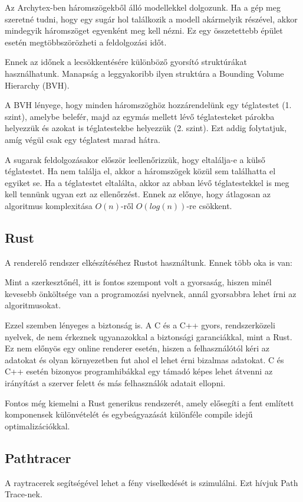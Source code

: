 Az Archytex-ben háromszögekből álló modellekkel dolgozunk. Ha a gép meg szeretné tudni, hogy egy sugár hol találkozik a modell akármelyik részével, akkor mindegyik háromszöget egyenként meg kell nézni. Ez egy összetettebb épület esetén megtöbbszörözheti a feldolgozási időt. 

Ennek az időnek a lecsökkentésére különböző gyorsító struktúrákat használhatunk. Manapság a leggyakoribb ilyen struktúra a Bounding Volume Hierarchy (BVH).

A BVH lényege, hogy minden háromszöghöz hozzárendelünk egy téglatestet (1. szint), amelybe belefér, majd az egymás mellett lévő téglatesteket párokba helyezzük és azokat is téglatestekbe helyezzük (2. szint). Ezt addig folytatjuk, amíg végül csak egy téglatest marad hátra. 

A sugarak feldolgozásakor először leellenőrizzük, hogy eltalálja-e a külső téglatestet. Ha nem találja el, akkor a háromszögek közül sem találhatta el egyiket se. Ha a téglatestet eltalálta, akkor az abban lévő téglatestekkel is meg kell tennünk ugyan ezt az ellenőrzést. Ennek az előnye, hogy átlagosan az algoritmus komplexitása $O(n)$-ről $O(log(n))$-re csökkent.

\subsection{Rust}
A renderelő rendszer elkészítéséhez Rustot használtunk. Ennek több oka is van:

Mint a szerkesztőnél, itt is fontos szempont volt a gyorsaság, hiszen minél kevesebb önköltsége van a programozási nyelvnek, annál gyorsabbra lehet írni az algoritmusokat.

Ezzel szemben lényeges a biztonság is. A C és a C++ gyors, rendszerközeli nyelvek, de nem érkeznek ugyanazokkal a biztonsági garanciákkal, mint a Rust. Ez nem előnyös egy online renderer esetén, hiszen a felhasználótól kéri az adatokat és olyan környezetben fut ahol el lehet érni bizalmas adatokat. C és C++ esetén bizonyos programhibákkal egy támadó képes lehet átvenni az irányítást a szerver felett és más felhasználók adatait ellopni.

Fontos még kiemelni a Rust generikus rendszerét, amely elősegíti a fent említett komponensek különvételét és egybeágyazását különféle compile idejű optimalizációkkal.

\subsection{Pathtracer}
A raytracerek segítségével lehet a fény viselkedését is szimulálni. Ezt hívjuk Path Trace-nek.

